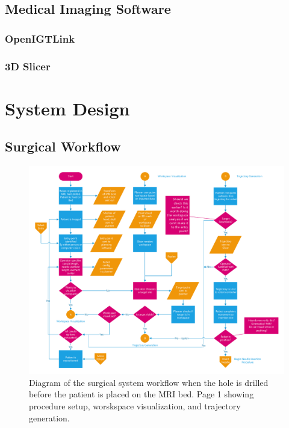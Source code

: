 \documentclass[12pt]{report}
\begin{document}
\section{Medical Imaging Software}
\subsection{OpenIGTLink}

\subsection{3D Slicer}


%
%


\chapter{System Design}
\section{Surgical Workflow}

\begin{figure}[thpb]
	\centering
	\includegraphics[page=1,width=\textwidth]{diagrams/Surgical_Workflow_-_Hole_Predrilled.pdf}
    \caption{Diagram of the surgical system workflow when the hole is drilled before the patient is placed on the MRI bed. Page 1 showing procedure setup, worskspace visualization, and trajectory generation.}
    \label{fig:surgicalWorkflowPg1}
\end{figure}
\end{document}
